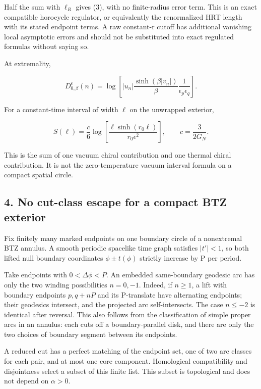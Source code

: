\documentclass[11pt]{article}
\begin{document}
Half the sum with \(\ell_R\) gives (3), with no finite-radius error
term. This is an exact compatible horocycle regulator, or equivalently
the renormalized HRT length with its stated endpoint terms. A raw
constant-r cutoff has additional vanishing local asymptotic errors and
should not be substituted into exact regulated formulas without saying
so.

At extremality,

\[
D_{0,\beta}^{\epsilon}(n)
=\log\!\left[
|u_n|\frac{\sinh(\beta|v_n|)}{\beta}
\frac1{\epsilon_p\epsilon_q}
\right].
\tag{4}
\]

For a constant-time interval of width \(\ell\) on the unwrapped
exterior,

\[
S(\ell)=\frac{c}{6}\log\!\left[
\frac{\ell\sinh(r_0\ell)}{r_0\epsilon^2}\right],
\qquad c=\frac3{2G_N}.
\tag{5}
\]

This is the sum of one vacuum chiral contribution and one thermal chiral
contribution. It is not the zero-temperature vacuum interval formula on
a compact spatial circle.

\subsection{4. No cut-class escape for a compact BTZ
exterior}\label{no-cut-class-escape-for-a-compact-btz-exterior}

Fix finitely many marked endpoints on one boundary circle of a
nonextremal BTZ annulus. A smooth periodic spacelike time graph
satisfies \(|t'|<1\), so both lifted null boundary coordinates
\(\phi\pm t(\phi)\) strictly increase by P per period.

Take endpoints with \(0<\Delta\phi<P\). An embedded same-boundary
geodesic arc has only the two winding possibilities \(n=0,-1\). Indeed,
if \(n\ge1\), a lift with boundary endpoints \(p,q+nP\) and its
P-translate have alternating endpoints; their geodesics intersect, and
the projected arc self-intersects. The case \(n\le-2\) is identical
after reversal. This also follows from the classification of simple
proper arcs in an annulus: each cuts off a boundary-parallel disk, and
there are only the two choices of boundary segment between its
endpoints.

A reduced cut has a perfect matching of the endpoint set, one of two arc
classes for each pair, and at most one core component. Homological
compatibility and disjointness select a subset of this finite list. This
subset is topological and does not depend on \(\alpha>0\).
\end{document}
